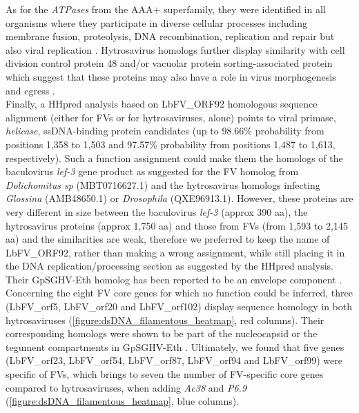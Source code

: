 As for the \textit{ATPases} from the AAA+ superfamily, they were identified in all organisms where they participate in diverse cellular processes including membrane fusion, proteolysis, DNA recombination, replication and repair but also viral replication \citep{ogura_aaa_2001, snider_aaa_2008,khan_oxidative_2022}. Hytrosavirus homologs further display similarity with cell division control protein 48 and/or vacuolar protein sorting-associated protein which suggest that these proteins may also have a role in virus morphogenesis and egress \citep{kolesnikova_vacuolar_2009, hilbert_structure_2015,ahmed_crystal_2019,huttunen_vaccinia_2021}.\\

Finally, a HHpred analysis \citep{gabler_protein_2020} based on LbFV\_ORF92 homologous sequence alignment (either for FVs or for hytrosaviruses, alone) points to viral primase, \textit{helicase}, ssDNA-binding protein candidates (up to 98.66\% probability from positions 1,358 to 1,503 and 97.57\% probability from positions 1,487 to 1,613, respectively). Such a function assignment could make them the homologs of the baculovirus \textit{lef-3} gene product \citep{evans_characterization_1999} as suggested for the FV homolog from \textit{Dolichomitus sp} (MBT0716627.1) and the hytrosavirus homologs infecting \textit{Glossina} (AMB48650.1) or \textit{Drosophila} (QXE96913.1). However, these proteins are very different in size between the baculovirus \textit{lef-3} (approx 390 aa), the  hytrosavirus proteins (approx 1,750 aa) and those from FVs (from 1,593 to 2,145 aa) and the similarities are weak, therefore we preferred to keep the name of LbFV\_ORF92, rather than making a wrong assignment, while still placing it in the DNA replication/processing section as suggested by the HHpred analysis. Their GpSGHV-Eth homolog has been reported to be an envelope component \citep{abd-alla_comprehensive_2016}.\\

Concerning the eight FV core genes for which no function could be inferred, three (LbFV\_orf5, LbFV\_orf20 and LbFV\_orf102) display sequence homology in both hytrosaviruses (\figurename{\ref{figure:dsDNA_filamentous_heatmap}}, red columns). Their corresponding homologs were shown to be part of the nucleocapsid or the tegument compartments in GpSGHV-Eth \citep{abd-alla_comprehensive_2016}. Ultimately, we found that five genes (LbFV\_orf23, LbFV\_orf54, LbFV\_orf87, LbFV\_orf94 and LbFV\_orf99) were specific of FVs, which brings to seven the number of FV-specific core genes compared to hytrosaviruses, when adding \textit{Ac38} and \textit{P6.9} (\figurename{\ref{figure:dsDNA_filamentous_heatmap}}, blue columns). 

